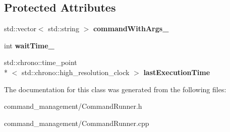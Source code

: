 \subsection*{Protected Attributes}
\begin{DoxyCompactItemize}
\item 
\hypertarget{classCommandRunner_a698a3db746e478a8f8473aefba861c12}{std\-::vector$<$ std\-::string $>$ {\bfseries command\-With\-Args\-\_\-}}\label{classCommandRunner_a698a3db746e478a8f8473aefba861c12}

\item 
\hypertarget{classCommandRunner_a9e1bf64d642a722eea30601df75fac2a}{int {\bfseries wait\-Time\-\_\-}}\label{classCommandRunner_a9e1bf64d642a722eea30601df75fac2a}

\item 
\hypertarget{classCommandRunner_a13fbe69bf315d3016b7dbcc75b71247b}{std\-::chrono\-::time\-\_\-point\\*
$<$ std\-::chrono\-::high\-\_\-resolution\-\_\-clock $>$ {\bfseries last\-Execution\-Time}}\label{classCommandRunner_a13fbe69bf315d3016b7dbcc75b71247b}

\end{DoxyCompactItemize}


The documentation for this class was generated from the following files\-:\begin{DoxyCompactItemize}
\item 
command\-\_\-management/Command\-Runner.\-h\item 
command\-\_\-management/Command\-Runner.\-cpp\end{DoxyCompactItemize}
